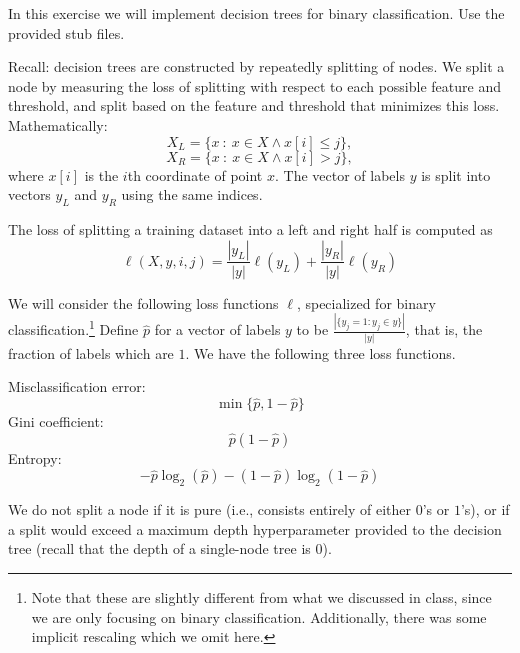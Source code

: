 \documentclass[10pt,letter,notitlepage]{article}
\newcounter{exercise}
\begin{document}
\begin{exercise}
  In this exercise we will implement decision trees for binary classification.
  Use the provided stub files.

  Recall: decision trees are constructed by repeatedly splitting of nodes.
  We split a node by measuring the loss of splitting with respect to each possible feature and threshold, and split based on the feature and threshold that minimizes this loss.
  Mathematically:
  \[X_L = \{x\ :\ x \in X \wedge  x[i] \leq j\},\]
  \[X_R = \{x\ :\ x \in X \wedge  x[i] > j\},\]
  where $x[i]$ is the $i$th coordinate of point $x$.
  The vector of labels $y$ is split into vectors $y_L$ and $y_R$ using the same indices.

  The loss of splitting a training dataset into a left and right half is computed as 
  \[\ell(X,y,i,j) = \frac{|y_L|}{|y|}\ell(y_L) + \frac{|y_R|}{|y|}\ell(y_R) \]

  We will consider the following loss functions $\ell$, specialized for binary classification.\footnote{Note that these are slightly different from what we discussed in class, since we are only focusing on binary classification. Additionally, there was some implicit rescaling which we omit here.}
  Define $\hat p$ for a vector of labels $y$ to be $\frac{|\{y_j = 1 : y_j \in y\}|}{|y|}$, that is, the fraction of labels which are $1$.
  We have the following three loss functions.

  \noindent Misclassification error:
  \[\min \{\hat p, 1-\hat p\}\]
  Gini coefficient:
  \[\hat p (1 - \hat p)\]
  Entropy:
  \[- \hat p \log_2 (\hat p) - (1 - \hat p) \log_2 (1 - \hat p ) \]

  We do not split a node if it is pure (i.e., consists entirely of either $0$'s or $1$'s), or if a split would exceed a maximum depth hyperparameter provided to the decision tree (recall that the depth of a single-node tree is $0$).




\end{exercise}
\end{document}
